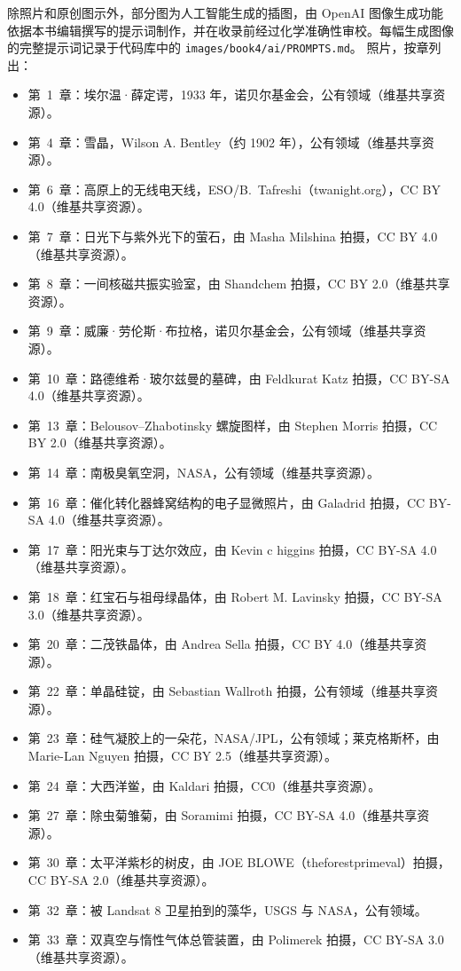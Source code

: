 \bigskip
除照片和原创图示外，部分图为人工智能生成的插图，由 OpenAI 图像生成功能依据本书编辑撰写的提示词制作，并在收录前经过化学准确性审校。每幅生成图像的完整提示词记录于代码库中的 \texttt{images/book4/ai/PROMPTS.md}。
\bigskip
\noindent 照片，按章列出：
\begin{itemize}\small
  \item 第~1~章：埃尔温·薛定谔，1933 年，诺贝尔基金会，公有领域（维基共享资源）。
  \item 第~4~章：雪晶，Wilson A. Bentley（约 1902 年），公有领域（维基共享资源）。
  \item 第~6~章：高原上的无线电天线，ESO/B.~Tafreshi（twanight.org），CC BY 4.0（维基共享资源）。
  \item 第~7~章：日光下与紫外光下的萤石，由 Masha Milshina 拍摄，CC BY 4.0（维基共享资源）。
  \item 第~8~章：一间核磁共振实验室，由 Shandchem 拍摄，CC BY 2.0（维基共享资源）。
  \item 第~9~章：威廉·劳伦斯·布拉格，诺贝尔基金会，公有领域（维基共享资源）。
  \item 第~10~章：路德维希·玻尔兹曼的墓碑，由 Feldkurat Katz 拍摄，CC BY-SA 4.0（维基共享资源）。
  \item 第~13~章：Belousov--Zhabotinsky 螺旋图样，由 Stephen Morris 拍摄，CC BY 2.0（维基共享资源）。
  \item 第~14~章：南极臭氧空洞，NASA，公有领域（维基共享资源）。
  \item 第~16~章：催化转化器蜂窝结构的电子显微照片，由 Galadrid 拍摄，CC BY-SA 4.0（维基共享资源）。
  \item 第~17~章：阳光束与丁达尔效应，由 Kevin c higgins 拍摄，CC BY-SA 4.0（维基共享资源）。
  \item 第~18~章：红宝石与祖母绿晶体，由 Robert M. Lavinsky 拍摄，CC BY-SA 3.0（维基共享资源）。
  \item 第~20~章：二茂铁晶体，由 Andrea Sella 拍摄，CC BY 4.0（维基共享资源）。
  \item 第~22~章：单晶硅锭，由 Sebastian Wallroth 拍摄，公有领域（维基共享资源）。
  \item 第~23~章：硅气凝胶上的一朵花，NASA/JPL，公有领域；莱克格斯杯，由 Marie-Lan Nguyen 拍摄，CC BY 2.5（维基共享资源）。
  \item 第~24~章：大西洋鲎，由 Kaldari 拍摄，CC0（维基共享资源）。
  \item 第~27~章：除虫菊雏菊，由 Soramimi 拍摄，CC BY-SA 4.0（维基共享资源）。
  \item 第~30~章：太平洋紫杉的树皮，由 JOE BLOWE（theforestprimeval）拍摄，CC BY-SA 2.0（维基共享资源）。
  \item 第~32~章：被 Landsat 8 卫星拍到的藻华，USGS 与 NASA，公有领域。
  \item 第~33~章：双真空与惰性气体总管装置，由 Polimerek 拍摄，CC BY-SA 3.0（维基共享资源）。
\end{itemize}
\clearpage
